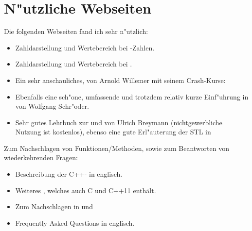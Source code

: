 \chapter{N"utzliche Webseiten}
\label{sec:appendix}
%
Die folgenden Webseiten fand ich sehr n"utzlich:
\begin{itemize}
 \item Zahldarstellung und Wertebereich bei
    -Zahlen.
 \item Zahldarstellung und Wertebereich bei
    .
 \item Ein sehr anschauliches,
   von Arnold Willemer mit seinem Crash-Kurse: \\

 \item Ebenfalls eine sch"one, umfassende und trotzdem relativ kurze Einf"uhrung in
       von Wolfgang Schr"oder.
 \item Sehr gutes Lehrbuch zur
        und
        von Ulrich Breymann
       (nichtgewerbliche Nutzung ist kostenlos),
       ebenso eine gute Erl"auterung der STL in
\end{itemize}

Zum Nachschlagen von Funktionen/Methoden, sowie zum Beantworten von
wiederkehrenden Fragen:
\begin{itemize}
  \item Beschreibung der C++-
 in englisch.
  \item Weiteres , 
   welches auch C und C++11 enth\"alt.
   \item Zum Nachschlagen in  und 
 \item Frequently Asked Questions
 in englisch.
\end{itemize}

